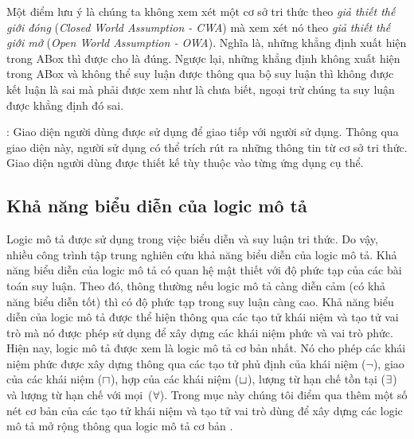 Một điểm lưu ý là chúng ta không xem xét một cơ sở tri thức theo {\em giả thiết thế giới đóng} ({\em Closed World Assumption - CWA}) mà xem xét nó theo {\em giả thiết thế giới mở} ({\em Open World Assumption - OWA}). Nghĩa là, những khẳng định xuất hiện trong ABox thì được cho là đúng. Ngược lại, những khẳng định không xuất hiện trong ABox và không thể suy luận được thông qua bộ suy luận thì không được kết luận là sai mà phải được xem như là chưa biết, ngoại trừ chúng ta suy luận được khẳng định đó sai.
	
: Giao diện người dùng được sử dụng để giao tiếp với người sử dụng. Thông qua giao diện này, người sử dụng có thể trích rút ra những thông tin từ cơ sở tri thức. Giao diện người dùng được thiết kế tùy thuộc vào từng ứng dụng cụ thể.  

\subsection{Khả năng biểu diễn của logic mô tả}
\label{sec:Chap1.Expressiveness}
Logic mô tả được sử dụng trong việc biểu diễn và suy luận tri thức. Do vậy, nhiều công trình tập trung nghiên cứu khả năng biểu diễn của logic mô tả. Khả năng biểu diễn của logic mô tả có quan hệ mật thiết với độ phức tạp của các bài toán suy luận. Theo đó, thông thường nếu logic mô tả càng diễn cảm (có khả năng biểu diễn tốt) thì có độ phức tạp trong suy luận càng cao. Khả năng biểu diễn của logic mô tả được thể hiện thông qua các tạo tử khái niệm và tạo tử vai trò mà nó được phép sử dụng để xây dựng các khái niệm phức và vai trò phức. 
Hiện nay, logic mô tả \ALC được xem là logic mô tả cơ bản nhất. Nó cho phép các khái niệm phức được xây dựng thông qua các tạo tử phủ định của khái niệm ($\neg$), giao của các khái niệm ($\sqcap$), hợp của các khái niệm ($\sqcup$), lượng từ hạn chế tồn tại ($\exists$) và lượng từ hạn chế với mọi~($\forall$).
Trong mục này chúng tôi điểm qua thêm một số nét cơ bản của các tạo tử khái niệm và tạo tử vai trò dùng để xây dựng các logic mô tả mở rộng thông qua logic mô tả cơ bản \ALC.

